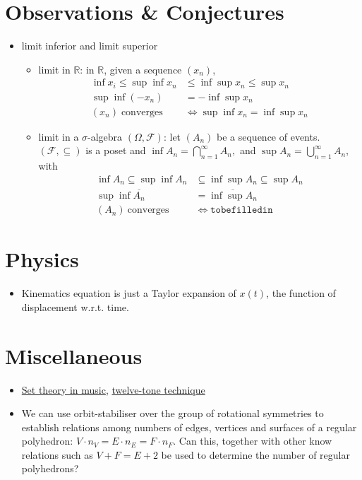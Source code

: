 \documentclass[a4paper]{article}
\begin{document}
\section{Observations \& Conjectures}

\begin{itemize}
\item limit inferior and limit superior
  \begin{itemize}
  \item limit in $\mathbb{R}$: in $\mathbb{R}$, given a sequence $(x_n)$,
    \begin{align*}
      \inf x_i \leq \sup\inf x_n &\leq \inf\sup x_n \leq \sup x_n \\
      \sup\inf (-x_n) &= -\inf\sup x_n\\
      (x_n) \; \text{converges } &\Leftrightarrow \sup\inf x_n = \inf\sup x_n
    \end{align*}

  \item limit in a $\sigma$-algebra $(\Omega, \mathcal{F})$: let $(A_n)$ be a sequence of events. $(\mathcal{F}, \subseteq)$ is a poset and $\inf A_n = \bigcap_{n=1}^\infty A_n,$ and $\sup A_n = \bigcup_{n=1}^\infty A_n$, with
    \begin{align*}
      \inf A_n \subseteq \sup\inf A_n &\subseteq \inf\sup A_n \subseteq \sup A_n \\
      \sup\inf \overline{A_n} &= \overline{\inf\sup A_n} \\
      (A_n) \: \text{converges } &\Leftrightarrow \mathtt{to be filled in}
    \end{align*}
  \end{itemize}
\end{itemize}
\section{Physics}

\begin{itemize}
\item Kinematics equation is just a Taylor expansion of $x(t)$, the function of displacement w.r.t. time.
\end{itemize}

\section{Miscellaneous}

\begin{itemize}
\item \href{https://en.wikipedia.org/wiki/Set_theory_(music)}{Set theory in music}, \href{https://en.wikipedia.org/wiki/Twelve-tone_technique}{twelve-tone technique}
  \item We can use orbit-stabiliser over the group of rotational symmetries to establish relations among numbers of edges, vertices and surfaces of a regular polyhedron: $V \cdot n_V = E \cdot n_E = F \cdot n_F$. Can this, together with other know relations such as $V+F=E+2$ be used to determine the number of regular polyhedrons?
\end{itemize}
\end{document}
